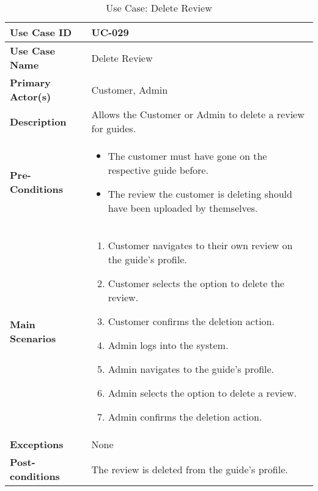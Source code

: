 \begin{table}[ht]
    \centering
    \begin{tabular}{|l|p{}|}
        \hline
        \textbf{Use Case ID} & UC-029 \\
        \hline
        \textbf{Use Case Name} & Delete Review \\
        \hline
        \textbf{Primary Actor(s)} & Customer, Admin \\
        \hline
        \textbf{Description} & Allows the Customer or Admin to delete a review for guides. \\
        \hline
        \textbf{Pre-Conditions} & 
        \begin{itemize}[itemsep=0pt]
            \item The customer must have gone on the respective guide before.
            \item The review the customer is deleting should have been uploaded by themselves.
        \end{itemize} \\
        \hline
        \textbf{Main Scenarios} & 
        \begin{enumerate}[label=\arabic*.,itemsep=0pt]
            \item Customer navigates to their own review on the guide's profile.
            \item Customer selects the option to delete the review.
            \item Customer confirms the deletion action.
            \item Admin logs into the system.
            \item Admin navigates to the guide's profile.
            \item Admin selects the option to delete a review.
            \item Admin confirms the deletion action.
        \end{enumerate} \\
        \hline
        \textbf{Exceptions} & None \\
        \hline
        \textbf{Post-conditions} & The review is deleted from the guide's profile. \\
        \hline
    \end{tabular}
    \label{tab:use-case-delete-review}
    \caption{Use Case: Delete Review}
\end{table}


